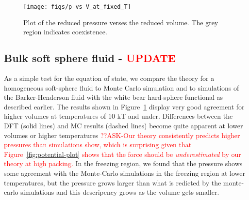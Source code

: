\documentclass[letterpaper,twocolumn,amsmath,amssymb,prb]{revtex4-1}
\begin{document}
\begin{figure}
 \begin{center}
  \texttt{[image: figs/p-vs-V\_at\_fixed\_T]}
 \end{center}
\caption{Plot of the reduced pressure verses the reduced volume. The grey region indicates coexistence.}
\label{fig:p-vs-V_at_fixed_T}
\end{figure}

\subsection{Bulk soft sphere fluid - \textcolor{red}{UPDATE}}

As a simple test for the equation of state, we compare the theory for
a homogeneous soft-sphere fluid to Monte Carlo simulation and to 
simulations of the Barker-Henderson fluid with the white bear 
hard-sphere functional as described earlier. The results
shown in Figure~\ref{fig:p-vs-V_at_fixed_T} display very good agreement 
for higher volumes at temperatures of 10 kT and under. 
Differences between the DFT (solid lines) and MC results (dashed lines) 
become quite apparent at lower volumes or higher temperatures 
\textcolor{red}{??ASK-Our theory consistently predicts higher pressures than
simulations show, which is surprising given that
Figure~\ref{fig:potential-plot} shows that the force should be
\emph{underestimated} by our theory at high packing.} 
In the freezing region, we found that the pressure shows some 
agreement with the Monte-Carlo simulations in the freezing region 
at lower temperatures, but the pressure grows larger than what is 
redicted by the monte-carlo simulations and this
descripency grows as the volume gets smaller.
\end{document}
